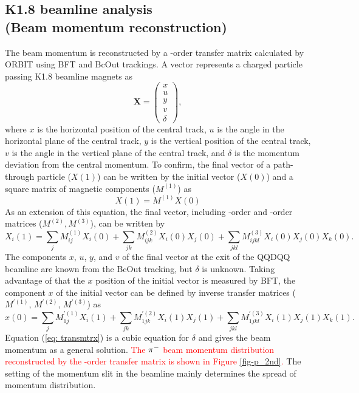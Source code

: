 \subsection{K1.8 beamline analysis\\(Beam momentum reconstruction)}
The beam momentum is reconstructed by a -order transfer matrix calculated by ORBIT using BFT and BcOut trackings. A vector represents a charged particle passing K1.8 beamline magnets as 
\begin{equation}
  \bm{X} = 
\begin{pmatrix}
 x  \\
 u  \\
 y  \\
 v  \\
 \delta   
\end{pmatrix},
\end{equation}
where $x$ is the horizontal position of the central track, $u$ is the angle in the horizontal plane of the central track, $y$ is the vertical position of the central track, $v$ is the angle in the vertical plane of the central track, and $\delta$ is the momentum deviation from the central momentum. To confirm, the final vector of a path-through particle ($X(1)$) can be written by the initial vector ($X(0)$) and a square matrix of magnetic components ($M^{(1)}$) as
\begin{equation}
  X(1) = M^{(1)} X(0)
\end{equation}
As an extension of this equation, the final vector, including -order and -order matrices ($M^{(2)}, M^{(3)}$), can be written by
\begin{equation}
  X_{i}(1) = \sum_{j} M_{ij}^{(1)} X_{i}(0) + \sum_{jk} M_{ijk}^{(2)} X_{i}(0)X_{j}(0) + \sum_{jkl} M_{ijkl}^{(3)} X_{i}(0)X_{j}(0)X_{k}(0).
\end{equation}
The components $x$, $u$, $y$, and $v$ of the final vector at the exit of the QQDQQ beamline are known from the BcOut tracking, but $\delta$ is unknown. Taking advantage of that the $x$ position of the initial vector is measured by BFT, the component $x$ of the initial vector can be defined by inverse transfer matrices ($M^{'(1)}$, $M^{'(2)}$, $M^{'(3)}$) as
\begin{equation}
  x(0) = \sum_{j} M_{1j}^{'(1)} X_{i}(1) + \sum_{jk} M_{1jk}^{'(2)} X_{i}(1)X_{j}(1) + \sum_{jkl} M_{1jkl}^{'(3)} X_{i}(1)X_{j}(1)X_{k}(1).
  \label{eq: transmtrx}
\end{equation}
Equation (\ref{eq: transmtrx}) is a cubic equation for $\delta$ and gives the beam momentum as a general solution. \textcolor{red}{ The $\pi^{-}$ beam momentum distribution reconstructed by the -order transfer matrix is shown in Figure \ref{fig-p_2nd}.} The setting of the momentum slit in the beamline mainly determines the spread of momentum distribution.

